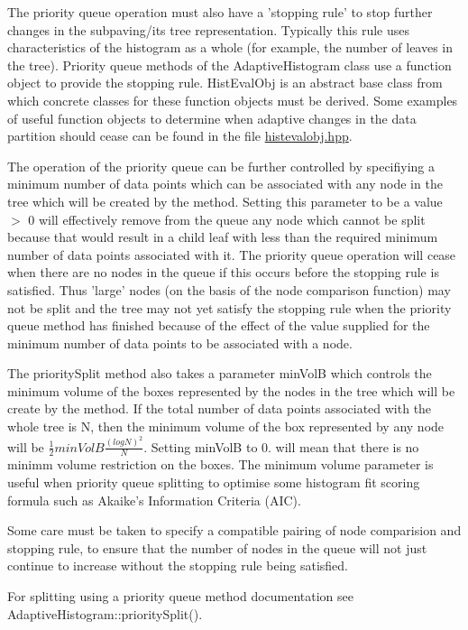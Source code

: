 \-The priority queue operation must also have a 'stopping rule' to stop further changes in the subpaving/its tree representation. \-Typically this rule uses characteristics of the histogram as a whole (for example, the number of leaves in the tree). \-Priority queue methods of the \-Adaptive\-Histogram class use a function object to provide the stopping rule. \-Hist\-Eval\-Obj is an abstract base class from which concrete classes for these function objects must be derived. \-Some examples of useful function objects to determine when adaptive changes in the data partition should cease can be found in the file \hyperlink{histevalobj_8hpp}{histevalobj.\-hpp}.

\-The operation of the priority queue can be further controlled by specifiying a minimum number of data points which can be associated with any node in the tree which will be created by the method. \-Setting this parameter to be a value $>$ 0 will effectively remove from the queue any node which cannot be split because that would result in a child leaf with less than the required minimum number of data points associated with it. \-The priority queue operation will cease when there are no nodes in the queue if this occurs before the stopping rule is satisfied. \-Thus 'large' nodes (on the basis of the node comparison function) may not be split and the tree may not yet satisfy the stopping rule when the priority queue method has finished because of the effect of the value supplied for the minimum number of data points to be associated with a node.

\-The priority\-Split method also takes a parameter min\-Vol\-B which controls the minimum volume of the boxes represented by the nodes in the tree which will be create by the method. \-If the total number of data points associated with the whole tree is \-N, then the minimum volume of the box represented by any node will be $ \frac{1}{2} minVolB \frac{(logN)^2}{N} $. \-Setting min\-Vol\-B to 0. will mean that there is no minimm volume restriction on the boxes. \-The minimum volume parameter is useful when priority queue splitting to optimise some histogram fit scoring formula such as \-Akaike's \-Information \-Criteria (\-A\-I\-C).

\-Some care must be taken to specify a compatible pairing of node comparision and stopping rule, to ensure that the number of nodes in the queue will not just continue to increase without the stopping rule being satisfied.

\-For splitting using a priority queue method documentation see \-Adaptive\-Histogram\-::priority\-Split().

